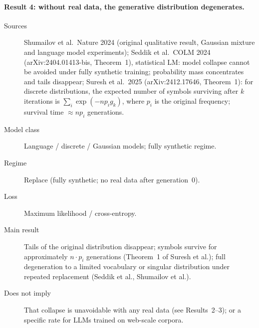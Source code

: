\paragraph{Result 4: without real data, the generative distribution degenerates.}
\begin{description}
\item[Sources]
  Shumailov et al.\ Nature 2024 (original qualitative result, Gaussian mixture
  and language model experiments);
  Seddik et al.\ COLM 2024 (arXiv:2404.01413-bis, Theorem~1), statistical LM:
  model collapse cannot be avoided under fully synthetic training; probability mass
  concentrates and tails disappear;
  Suresh et al.\ 2025 (arXiv:2412.17646, Theorem~1): for discrete distributions,
  the expected number of symbols surviving after $k$ iterations is
  $\sum_i \exp(-n p_i g_k)$, where $p_i$ is the original frequency; survival time
  $\approx n p_i$ generations.
\item[Model class] Language / discrete / Gaussian models; fully synthetic regime.
\item[Regime] Replace (fully synthetic; no real data after generation~0).
\item[Loss] Maximum likelihood / cross-entropy.
\item[Main result] Tails of the original distribution disappear; symbols survive
  for approximately $n \cdot p_i$ generations (Theorem~1 of Suresh et al.); full
  degeneration to a limited vocabulary or singular distribution under repeated
  replacement (Seddik et al., Shumailov et al.).
\item[Does not imply] That collapse is unavoidable with any real data (see
  Results~2--3); or a specific rate for LLMs trained on web-scale corpora.
\end{description}

